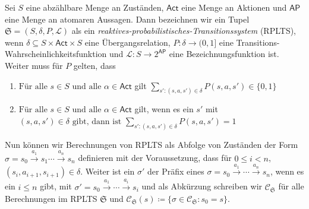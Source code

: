 \begin{definition}
	Sei $S$ eine abzählbare Menge an Zuständen, $\mathsf{Act}$ eine Menge an Aktionen und $\mathsf{AP}$ eine Menge an atomaren Aussagen.
	Dann bezeichnen wir ein Tupel $\mathfrak{S}=(S,\delta,P,\mathcal{L})$ als ein \textit{reaktives-probabilistisches-Transitionssystem} (RPLTS), wenn $\delta\subseteq S\times \mathsf{Act} \times S$ eine Übergangsrelation, $P:\delta\to (0,1]$ eine Transitions-Wahrscheinlichkeitsfunktion und $\mathcal{L}:S\to2^{\mathsf{AP}}$ eine Bezeichnungsfunktion ist.
	Weiter muss für $P$ gelten, dass
	\begin{enumerate}
		\item $\text{Für alle }s\in S\text{ und alle }\alpha\in \mathsf{Act}$ gilt $\sum_{s' : (s,a,s')\in \delta} P(s,a,s')\in \{0,1\}$
		\item $\text{Für alle }s\in S\text{ und alle }\alpha\in \mathsf{Act}$ gilt, wenn es ein $s'$ mit $(s,a,s')\in \delta \text{ gibt, dann ist}$ $\sum_{s' : (s,a,s')\in \delta} P(s,a,s') = 1$ \cite{cleaveland2005probabilistic}
	\end{enumerate}
\end{definition}

Nun können wir Berechnungen von RPLTS als Abfolge von Zuständen der Form $\sigma = s_0\xrightarrow{a_1}s_1 \cdots \xrightarrow{a_n}s_n$ definieren mit der Voraussetzung, dass für $0\leq i <n$, $(s_i,a_{i+1},s_{i+1})\in \delta$.
Weiter ist ein $\sigma'$ der Präfix eines $\sigma=s_0\xrightarrow{a_1} \cdots \xrightarrow{a_n}s_n$, wenn es ein $i\leq n$ gibt, mit $\sigma' = s_0\xrightarrow{a_1}\cdots \xrightarrow{a_i}s_i$ und als Abkürzung schreiben wir $\mathcal{C}_\mathfrak{S}$ für alle Berechnungen im RPLTS $\mathfrak{S}$ und $\mathcal{C}_\mathfrak{S}(s)\coloneqq \{\sigma\in \mathcal{C}_\mathfrak{S} : s_0=s\}$. \cite{cleaveland2005probabilistic}


